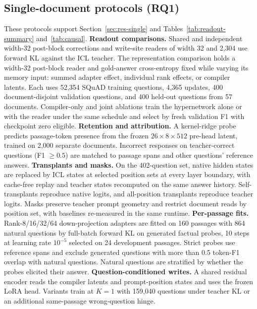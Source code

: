 \subsection{Single-document protocols (RQ1)}
These protocols support Section~\ref{sec:res-single} and
Tables~\ref{tab:readout-summary} and~\ref{tab:causal}.
\textbf{Readout comparisons.} Shared and independent width-32 post-block corrections
and write-site readers of width 32 and 2,304 use forward KL against the ICL teacher.
The representation comparison holds a width-32 post-block reader and gold-answer
cross-entropy fixed while varying its memory input: summed adapter effect,
individual rank effects, or compiler latents. Each uses 52,354 SQuAD training
questions, 4,365 updates, 400 document-disjoint validation questions, and 400
held-out questions from 57 documents. Compiler-only and joint ablations train the
hypernetwork alone or with the reader under the same schedule and select by fresh
validation F1 with checkpoint zero eligible. \textbf{Retention and attribution.} A
kernel-ridge probe predicts passage-token presence from the frozen
$26\times8\times512$ pre-head latent, trained on 2,000 separate documents.
Incorrect responses on teacher-correct questions (F1 $\geq0.5$) are matched to
passage spans and other questions' reference answers. \textbf{Transplants and
masks.} On the 402-question set, native hidden states are replaced by ICL states at
selected position sets at every layer boundary, with cache-free replay and teacher
states recomputed on the same answer history. Self-transplants reproduce native
logits, and all-position transplants reproduce teacher logits. Masks preserve teacher prompt
geometry and restrict document reads by position set, with baselines re-measured in
the same runtime. \textbf{Per-passage fits.} Rank-8/16/32/64 down-projection
adapters are fitted on 160 passages with 864 natural questions by full-batch forward
KL on generated factual probes, 10 steps at learning rate $10^{-5}$ selected on 24
development passages. Strict probes use reference spans and exclude generated
questions with more than 0.5 token-F1 overlap with natural questions.
Natural questions are stratified by whether the probes elicited their answer.
\textbf{Question-conditioned writes.} A shared residual encoder reads the
compiler latents and prompt-position states and uses the frozen LoRA head. Variants
train at $K=1$ with 159,040 questions under teacher KL or an additional
same-passage wrong-question hinge.

